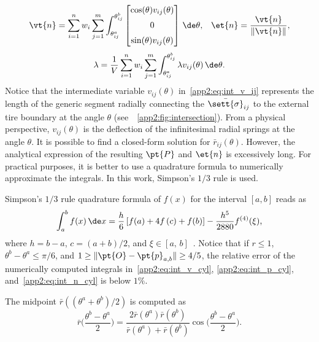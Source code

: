 %
\begin{equation}
  \vt{n} =
  \sum_{i=1}^{n}w_i\sum_{j=1}^{m} \displaystyle\int_{\theta^a_{ij}}^{\theta^b_{ij}}
  \begin{bmatrix}
    \cos(\theta)v_{ij}(\theta)
    \\[2mm]
    0
    \\[2mm]
    \sin(\theta)v_{ij}(\theta)
  \end{bmatrix} \, \de\theta \text{,} \quad
  \et{n} = \dfrac{\vt{n}}{\|\vt{n}\|}
  \text{,}
  \label{app2:eq:int_n_cyl}
\end{equation}
%
\begin{equation}
  \lambda = \dfrac{1}{V} \sum_{i=1}^{n}w_i\sum_{j=1}^{m} \int_{\theta^a_{ij}}^{\theta^b_{ij}} \lambda v_{ij}(\theta) \, \de\theta
  \text{.}
  \label{app2:eq:int_l_cyl}
\end{equation}
%
Notice that the intermediate variable $v_{ij}(\theta)$ in~\eqref{app2:eq:int_v_ij} represents the length of the generic segment radially connecting the $\bar{\sett{\sigma}}_{ij}$ to the external tire boundary at the angle $\theta$ (see~\figurename{}~\ref{app2:fig:intersection}). From a physical perspective, $v_{ij}(\theta)$ is the deflection of the infinitesimal radial springs at the angle $\theta$. It is possible to find a closed-form solution for $\bar{r}_{ij}(\theta)$. However, the analytical expression of the resulting $\pt{P}$ and $\et{n}$ is excessively long. For practical purposes, it is better to use a quadrature formula to numerically approximate the integrals. In this work, Simpson's $1/3$ rule is used.
%
\begin{remark}
  Simpson's $1/3$ rule quadrature formula of $f(x)$ for the interval $[a,b]$ reads as
  \begin{equation*}
    \int_{a}^b f(x)\,\de x = \dfrac{h}{6}\left[ f(a) + 4f\left(c\right)+f(b)\right] - \dfrac{h^5}{2880} f^{(4)}(\xi)
    \text{,}
  \end{equation*}
  where $h = b-a$, $c = (a+b)/2$, and $\xi \in [a, \, b]$~\cite{stoer2002introduction}. Notice that if $r \leq 1$, $\theta^b-\theta^a \leq \pi/6$, and $1 \geq \|\pt{O}-\pt{p}_{a,b}\| \geq 4/5$, the relative error of the numerically computed integrals in~\eqref{app2:eq:int_v_cyl}, \eqref{app2:eq:int_p_cyl}, and~\eqref{app2:eq:int_n_cyl} is below $1\%$.
\end{remark}
%
\begin{remark}
  The midpoint $\bar{r}((\theta^a+\theta^b)/2)$ is computed as
  \begin{equation*}
    \bar{r}\bigg(\dfrac{\theta^b-\theta^a}{2}\bigg) = \dfrac{2\bar{r}(\theta^a)\bar{r}(\theta^b)}{\bar{r}(\theta^a)+\bar{r}(\theta^b)}\cos\bigg(\dfrac{\theta^b-\theta^a}{2}\bigg)
    \text{.}
  \end{equation*}
\end{remark}

